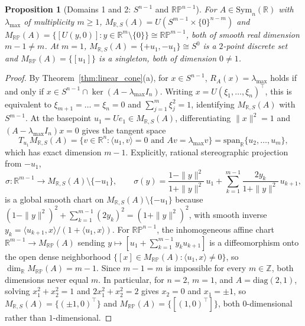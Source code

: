 \documentclass[11pt,a4paper]{article}
\newtheorem{proposition}[theorem]{Proposition}
\theoremstyle{definition}
\theoremstyle{remark}
\newcommand{\RR}{\mathbb{R}}
\newcommand{\ZZ}{\mathbb{Z}}
\newcommand{\RP}{\mathbb{RP}}
\newcommand{\Sym}{\mathrm{Sym}}
\newcommand{\diag}{\mathrm{diag}}
\begin{document}
\begin{proposition}[Domains 1 and 2: $S^{n-1}$ and $\RP^{n-1}$]
\label{prop:real_sphere_proj}
For $A \in \Sym_n(\RR)$ with $\lambda_{\max}$ of multiplicity $m \ge 1$, $M_{\RR, S}(A) = U(S^{m-1} \times \{0\}^{n-m})$ and $M_{\RP}(A) = \{[U(y, 0)] : y \in \RR^m \setminus \{0\}\} \cong \RP^{m-1}$, both of smooth real dimension $m - 1 \neq m$. At $m = 1$, $M_{\RR, S}(A) = \{+u_1, -u_1\} \cong S^0$ is a $2$-point discrete set and $M_{\RP}(A) = \{[u_1]\}$ is a singleton, both of dimension $0 \neq 1$.
\end{proposition}

\begin{proof}
By Theorem~\ref{thm:linear_cone}(a), for $x \in S^{n-1}$, $R_A(x) = \lambda_{\max}$ holds if and only if $x \in S^{n-1} \cap \ker(A - \lambda_{\max} I_n)$. Writing $x = U(\xi_1, \dots, \xi_n)^\top$, this is equivalent to $\xi_{m+1} = \dots = \xi_n = 0$ and $\sum_{j=1}^m \xi_j^2 = 1$, identifying $M_{\RR, S}(A)$ with $S^{m-1}$. At the basepoint $u_1 = U e_1 \in M_{\RR, S}(A)$, differentiating $\|x\|^2 = 1$ and $(A - \lambda_{\max} I_n) x = 0$ gives the tangent space
\[
  T_{u_1} M_{\RR, S}(A) = \{v \in \RR^n : \langle u_1, v \rangle = 0 \text{ and } A v = \lambda_{\max} v\} = \mathrm{span}_{\RR}\{u_2, \dots, u_m\},
\]
which has exact dimension $m - 1$. Explicitly, rational stereographic projection from $-u_1$,
\[
  \sigma : \RR^{m-1} \longrightarrow M_{\RR, S}(A) \setminus \{-u_1\}, \qquad
  \sigma(y) = \frac{1 - \|y\|^2}{1 + \|y\|^2}\, u_1 + \sum_{k=1}^{m-1} \frac{2 y_k}{1 + \|y\|^2}\, u_{k+1},
\]
is a global smooth chart on $M_{\RR, S}(A) \setminus \{-u_1\}$ because $(1 - \|y\|^2)^2 + \sum_{k=1}^{m-1} (2 y_k)^2 = (1 + \|y\|^2)^2$, with smooth inverse $y_k = \langle u_{k+1}, x \rangle / (1 + \langle u_1, x \rangle)$. For $\RP^{n-1}$, the inhomogeneous affine chart $\RR^{m-1} \to M_{\RP}(A)$ sending $y \mapsto [u_1 + \sum_{k=1}^{m-1} y_k u_{k+1}]$ is a diffeomorphism onto the open dense neighborhood $\{[x] \in M_{\RP}(A) : \langle u_1, x \rangle \neq 0\}$, so $\dim_{\RR} M_{\RP}(A) = m - 1$. Since $m - 1 = m$ is impossible for every $m \in \ZZ$, both dimensions never equal $m$. In particular, for $n = 2$, $m = 1$, and $A = \diag(2, 1)$, solving $x_1^2 + x_2^2 = 1$ and $2 x_1^2 + x_2^2 = 2$ gives $x_2 = 0$ and $x_1 = \pm 1$, so $M_{\RR, S}(A) = \{(\pm 1, 0)^\top\}$ and $M_{\RP}(A) = \{[(1, 0)^\top]\}$, both $0$-dimensional rather than $1$-dimensional.
\end{proof}
\end{document}

